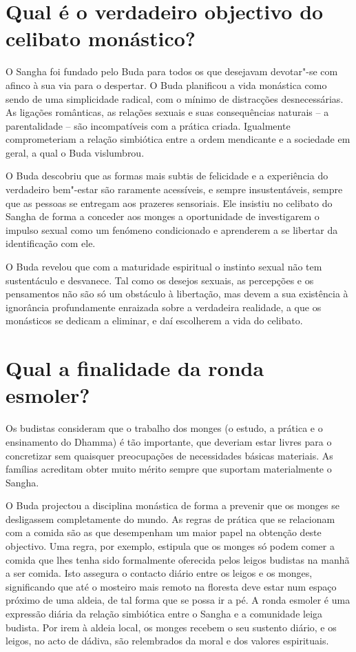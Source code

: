 \section{Qual é o verdadeiro objectivo do celibato monástico?}

O Sangha foi fundado pelo Buda para todos os que desejavam devotar"-se
com afinco à sua via para o despertar. O Buda planificou a vida
monástica como sendo de uma simplicidade radical, com o mínimo de
distracções desnecessárias. As ligações românticas, as relações sexuais
e suas consequências naturais -- a parentalidade -- são incompatíveis
com a prática criada. Igualmente comprometeriam a relação simbiótica
entre a ordem mendicante e a sociedade em geral, a qual o Buda
vislumbrou.

O Buda descobriu que as formas mais subtis de felicidade e a experiência
do verdadeiro bem"-estar são raramente acessíveis, e sempre
insustentáveis, sempre que as pessoas se entregam aos prazeres
sensoriais. Ele insistiu no celibato do Sangha de forma a conceder aos
monges a oportunidade de investigarem o impulso sexual como um fenómeno
condicionado e aprenderem a se libertar da identificação com ele.

O Buda revelou que com a maturidade espiritual o instinto sexual não tem
sustentáculo e desvanece. Tal como os desejos sexuais, as percepções e
os pensamentos não são só um obstáculo à libertação, mas devem a sua
existência à ignorância profundamente enraizada sobre a verdadeira
realidade, a que os monásticos se dedicam a eliminar, e daí escolherem a
vida do celibato.

\section{Qual a finalidade da ronda esmoler?}

Os budistas consideram que o trabalho dos monges (o estudo, a prática e
o ensinamento do Dhamma) é tão importante, que deveriam estar livres
para o concretizar sem quaisquer preocupações de necessidades básicas
materiais. As famílias acreditam obter muito mérito sempre que suportam
materialmente o Sangha.

O Buda projectou a disciplina monástica de forma a prevenir que os
monges se desligassem completamente do mundo. As regras de prática que
se relacionam com a comida são as que desempenham um maior papel na
obtenção deste objectivo. Uma regra, por exemplo, estipula que os monges
só podem comer a comida que lhes tenha sido formalmente oferecida pelos
leigos budistas na manhã a ser comida. Isto assegura o contacto diário
entre os leigos e os monges, significando que até o mosteiro mais remoto
na floresta deve estar num espaço próximo de uma aldeia, de tal forma
que se possa ir a pé. A ronda esmoler é uma expressão diária da relação
simbiótica entre o Sangha e a comunidade leiga budista. Por irem à
aldeia local, os monges recebem o seu sustento diário, e os leigos, no
acto de dádiva, são relembrados da moral e dos valores espirituais.

